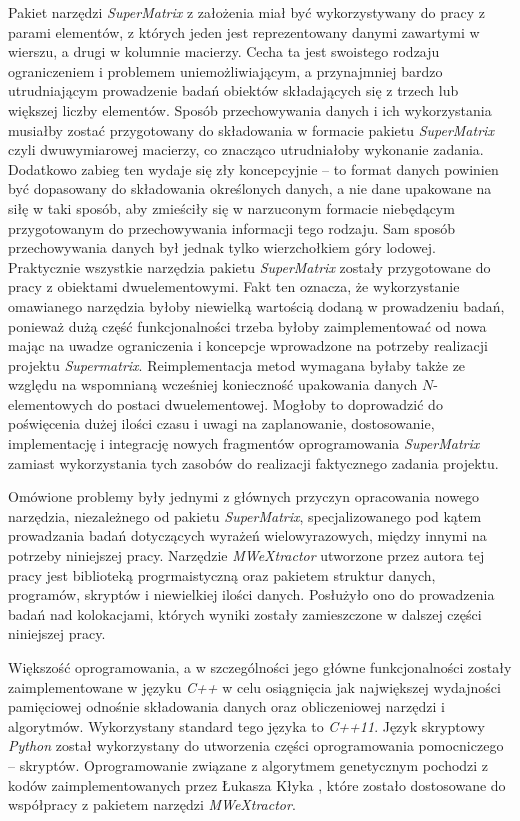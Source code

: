 \documentclass[11pt,a4paper]{llncs}
\begin{document}
Pakiet narzędzi \emph{SuperMatrix} z założenia miał być wykorzystywany do pracy z parami elementów, z których jeden jest reprezentowany danymi zawartymi w wierszu, a drugi w kolumnie macierzy.
Cecha ta jest swoistego rodzaju ograniczeniem i problemem uniemożliwiającym, a przynajmniej bardzo utrudniającym prowadzenie badań obiektów składających się z trzech lub większej liczby elementów.
Sposób przechowywania danych i ich wykorzystania musiałby zostać przygotowany do składowania w formacie pakietu \emph{SuperMatrix} czyli dwuwymiarowej macierzy, co znacząco utrudniałoby wykonanie zadania.
Dodatkowo zabieg ten wydaje się zły koncepcyjnie -- to format danych powinien być dopasowany do składowania określonych danych, a nie dane upakowane na siłę w taki sposób, aby zmieściły się w narzuconym formacie niebędącym przygotowanym do przechowywania informacji tego rodzaju.
Sam sposób przechowywania danych był jednak tylko wierzchołkiem góry lodowej.
Praktycznie wszystkie narzędzia pakietu \emph{SuperMatrix} zostały przygotowane do pracy z obiektami dwuelementowymi.
Fakt ten oznacza, że wykorzystanie omawianego narzędzia byłoby niewielką wartością dodaną w prowadzeniu badań, ponieważ dużą część funkcjonalności trzeba byłoby zaimplementować od nowa mając na uwadze ograniczenia i koncepcje wprowadzone na potrzeby realizacji projektu \emph{Supermatrix}.
Reimplementacja metod wymagana byłaby także ze względu na wspomnianą wcześniej konieczność upakowania danych $N$-elementowych do postaci dwuelementowej.
Mogłoby to doprowadzić do poświęcenia dużej ilości czasu i uwagi na zaplanowanie, dostosowanie, implementację i integrację nowych fragmentów oprogramowania \emph{SuperMatrix} zamiast wykorzystania tych zasobów do realizacji faktycznego zadania projektu.



Omówione problemy były jednymi z głównych przyczyn opracowania nowego narzędzia, niezależnego od pakietu \emph{SuperMatrix}, specjalizowanego pod kątem prowadzania badań dotyczących wyrażeń wielowyrazowych, między innymi na potrzeby niniejszej pracy.
Narzędzie \emph{MWeXtractor} utworzone przez autora tej pracy jest biblioteką progrmaistyczną oraz pakietem struktur danych, programów, skryptów i niewielkiej ilości danych.
Posłużyło ono do prowadzenia badań nad kolokacjami, których wyniki zostały zamieszczone w dalszej części niniejszej pracy.



Większość oprogramowania, a w szczególności jego główne funkcjonalności zostały zaimplementowane w języku \emph{C++} w celu osiągnięcia jak największej wydajności pamięciowej odnośnie składowania danych oraz obliczeniowej narzędzi i algorytmów.
Wykorzystany standard tego języka to \emph{C++11}.
Język skryptowy \emph{Python} został wykorzystany do utworzenia części oprogramowania pomocniczego -- skryptów.
Oprogramowanie związane z algorytmem genetycznym pochodzi z kodów zaimplementowanych przez Łukasza Kłyka \cite{klyk}, które zostało dostosowane do współpracy z pakietem narzędzi \emph{MWeXtractor}.
\end{document}
